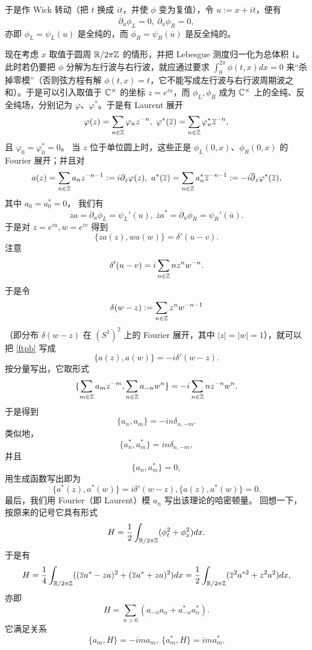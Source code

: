 于是作 Wick 转动（把 $t$ 换成 $it$，并使 $\phi$ 变为复值），令 $u:=x+it$，便有
$$
\overline\partial_u \phi_L=0,\ \partial_u \phi_R=0,
$$
亦即 $\phi_L=\psi_L(u)$ 是全纯的，而 $\phi_R=\psi_R(\overline u)$ 是反全纯的。

现在考虑 $x$ 取值于圆周 $\Bbb R/2\pi \Bbb Z$ 的情形，并把 Lebesgue 测度归一化为总体积 $1$。此时若仍要把 $\phi$ 分解为左行波与右行波，就应通过要求 $\int_0^{2\pi}\phi(t,x)dx=0$ 来“杀掉零模”（否则弦方程有解 $\phi(t,x)=t$，它不能写成左行波与右行波周期波之和）。于是可以引入取值于 $\Bbb C^\times$ 的坐标 $z=e^{iu}$，而 $\phi_L,\phi_R$ 成为 $\Bbb C^\times$ 上的全纯、反全纯场，分别记为
$\varphi$、$\varphi^*$。于是有 Laurent 展开
$$
\varphi(z)=\sum_{n\in \Bbb Z}\varphi_n z^{-n},\ \varphi^*(\overline z)=\sum_{n\in \Bbb Z}\varphi^*_n \overline z^{-n},
$$
且 $\varphi_0=\varphi_0^*=0$。
当 $z$ 位于单位圆上时，这些正是
$\phi_L(0,x)$、$\phi_R(0,x)$ 的 Fourier 展开；并且对
$$
a(z)=\sum_{n\in \Bbb Z}a_nz^{-n-1}:=i\partial_z \varphi(z),\ a^*(\overline z)=\sum_{n\in \Bbb Z}a_n^*\overline z^{-n-1}:=-i\overline\partial_z\varphi^*(\overline z),
$$
其中 $a_0=a_0^*=0$，
我们有
$$
za=\partial_u\phi_L=\psi_L'(u),\ \overline z a^*=\overline \partial_u\phi_R=\psi_R'(\overline u).
$$
于是对 $z=e^{iu},w=e^{iv}$ 得到
\begin{equation}\label{ftpb}
\lbrace za(z),wa(w)\rbrace=\delta'(u-v).
\end{equation}
注意
$$
\delta'(u-v)=i\sum_{n\in \Bbb Z}nz^{n}w^{-n}.
$$ 
于是令
$$
\delta(w-z):=\sum_{n\in \Bbb Z}z^nw^{-n-1}
$$
（即分布 $\delta(w-z)$ 在 $(S^1)^2$ 上的 Fourier 展开，其中
$|z|=|w|=1$），就可以把 \eqref{ftpb} 写成
\begin{equation}\label{ftpb1}
\lbrace a(z),a(w)\rbrace=-i\delta'(w-z).
\end{equation} 
按分量写出，它取形式
$$
\lbrace \sum_{m\in \Bbb Z}a_m z^{-m},\sum_{n\in \Bbb Z}a_{-n} w^{n}\rbrace=-i\sum_{n\in \Bbb Z}nz^{-n}w^n.
$$
于是得到
\begin{equation}\label{mlsb1}
\lbrace a_n, a_m\rbrace=-in\delta_{n,-m}.
\end{equation} 
类似地，
\begin{equation}\label{mlsb2}
\lbrace a_n^*,  a_m^*\rbrace=in\delta_{n,-m},
\end{equation}
并且
\begin{equation}\label{mlsb3}
\lbrace a_n, a_m^*\rbrace=0,
\end{equation} 
用生成函数写出即为
\begin{equation}\label{ftpb2}
\lbrace a^*(z),a^*(w)\rbrace=i\delta'(w-z), \lbrace a(z),a^*(w)\rbrace=0.
\end{equation} 
最后，我们用 Fourier（即 Laurent）模 $a_n$ 写出该理论的哈密顿量。
回想一下，按原来的记号它具有形式
$$
H=\frac{1}{2}\int_{\Bbb R/2\pi \Bbb Z} (\phi_t^2+\phi_x^2)dx.
$$
于是有
$$
H=\frac{1}{4}\int_{\Bbb R/2\pi \Bbb Z} ((\overline z a^*-z a)^2+(\overline z a^*+za)^2)dx=\frac{1}{2}\int_{\Bbb R/2\pi \Bbb Z}(\overline z^2a^{*2}+z^2a^2)dx,
$$
亦即
\begin{equation}\label{classham}
H=\sum_{n>0}(a_{-n}a_n+a_{-n}^*a_n^*).
\end{equation}
它满足关系
$$
\lbrace a_m,H\rbrace=-ima_m,\ \lbrace a_m^*,H\rbrace=ima_m^*.
$$

